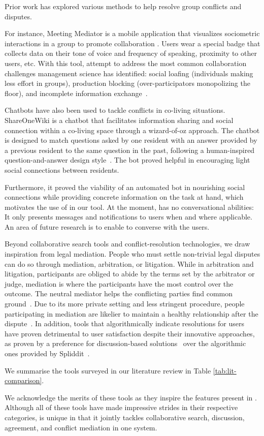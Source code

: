 Prior work has explored various methods to help resolve group conflicts and disputes.

For instance, Meeting Mediator is a mobile application that visualizes sociometric interactions in a group to promote collaboration \cite{meetingmediator}. Users wear a special badge that collects data on their tone of voice and frequency of speaking, proximity to other users, etc. With this tool, \citeauthor{meetingmediator} attempt to address the most common collaboration challenges management science has identified: social loafing (individuals making less effort in groups), production blocking (over-participators monopolizing the floor), and incomplete information exchange~\cite{meetingmediator}. 

Chatbots have also been used to tackle conflicts in co-living situations. ShareOneWiki is a chatbot that facilitates information sharing and social connection within a co-living space through a wizard-of-oz approach. The chatbot is designed to match questions asked by one resident with an answer provided by a previous resident to the same question in the past, following a human-inspired question-and-answer design style~\cite{shareonewiki}. The bot proved helpful in encouraging light social connections between residents.

Furthermore, it proved the viability of an automated bot in nourishing social connections while providing concrete information on the task at hand, which motivates the use of \cbot in our tool. At the moment, \cbot has no conversational abilities: It only presents messages and notifications to users when and where applicable. An area of future research is to enable \cbot to converse with the users.  

Beyond collaborative search tools and conflict-resolution technologies, we draw inspiration from legal mediation. People who must settle non-trivial legal disputes can do so through mediation, arbitration, or litigation. While in arbitration and litigation, participants are obliged to abide by the terms set by the arbitrator or judge, mediation is where the participants have the most control over the outcome. The neutral mediator helps the conflicting parties find common ground~\cite{disputeresolutionexplanation1}. Due to its more private setting and less stringent procedure, people participating in mediation are likelier to maintain a healthy relationship after the dispute~\cite{disputeresolutionexplanation2}. In addition, tools that algorithmically indicate resolutions for users have proven detrimental to user satisfaction despite their innovative approaches, as proven by a preference for discussion-based solutions~\cite{algorithmicmediation} over the algorithmic ones provided by Spliddit~\cite{spliddit}. 

We summarise the tools surveyed in our literature review in Table \ref{tab:lit-comparison}. 

We acknowledge the merits of these tools as they inspire the features present in \tool. Although all of these tools have made impressive strides in their respective categories, \tool is unique in that it jointly tackles collaborative search, discussion, agreement, and conflict mediation in one system.  